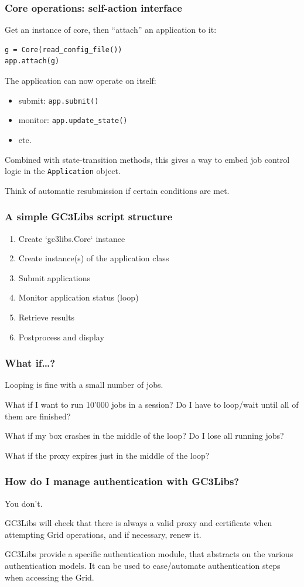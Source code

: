 \documentclass[presentation]{beamer}
\begin{document}
\begin{frame}[fragile]
\frametitle{Core operations: self-action interface}
\label{sec-15}

  Get an instance of core, then ``attach'' an application to it:
\begin{verbatim}
g = Core(read_config_file())
app.attach(g)
\end{verbatim}

  The application can now operate on itself:
\begin{itemize}
\item submit: \texttt{app.submit()}
\item monitor: \texttt{app.update\_state()}
\item etc.
\end{itemize}

  Combined with state-transition methods, this gives a way to embed
  job control logic in the \texttt{Application} object.

  Think of automatic resubmission if certain conditions are met.
\end{frame}
\begin{frame}
\frametitle{A simple GC3Libs script structure}
\label{sec-16}

\begin{enumerate}
\item Create `gc3libs.Core` instance
\item Create instance(s) of the application class
\item Submit applications
\item Monitor application status (loop)
\item Retrieve results
\item Postprocess and display
\end{enumerate}
\end{frame}
\begin{frame}
\frametitle{What if\ldots{}?}
\label{sec-17}

  Looping is fine with a small number of jobs.

  What if I want to run 10'000 jobs in a session? Do I have to
  loop/wait until all of them are finished?

  What if my box crashes in the middle of the loop?  Do I lose all
  running jobs? 

  What if the proxy expires just in the middle of the loop?
\end{frame}
\begin{frame}
\frametitle{How do I manage authentication with GC3Libs?}
\label{sec-18}

  You don't.

  GC3Libs will check that there is always a valid proxy and
  certificate when attempting Grid operations, and if necessary, renew
  it.  

  GC3Libs provide a specific authentication module, that abstracts on
  the various authentication models.  It can be used to ease/automate
  authentication steps when accessing the Grid.
\end{frame}
\end{document}
